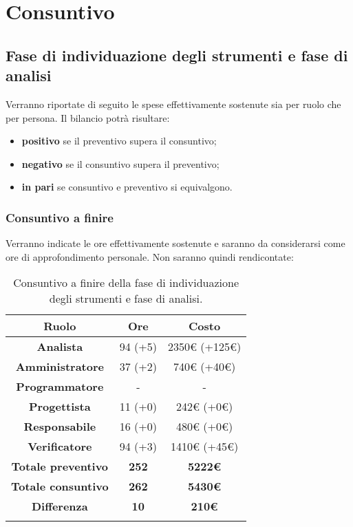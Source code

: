 \section{Consuntivo}

\subsection{Fase di individuazione degli strumenti e fase di analisi}
Verranno riportate di seguito le spese effettivamente sostenute sia per ruolo che per persona. Il bilancio potrà risultare:
\begin{itemize}
	\item \textbf{positivo} se il preventivo supera il consuntivo;
	\item \textbf{negativo} se il consuntivo supera il preventivo;
	\item \textbf{in pari} se consuntivo e preventivo si equivalgono.
\end{itemize}

\subsubsection{Consuntivo a finire}
Verranno indicate le ore effettivamente sostenute e saranno da considerarsi come ore di approfondimento personale. Non saranno quindi rendicontate:

\begin{center}
	\begin{longtable}{| c | c | c |}
		\hline
		\rowcolor[HTML]{F9CB9C} 
		\textbf{Ruolo} & \textbf{Ore} & \textbf{Costo}  \\ \hline
		\textbf{Analista} & 94 (+5) & 2350€ (+125€)  \\ \hline
		\textbf{Amministratore} & 37 (+2) & 740€ (+40€)  \\ \hline
		\textbf{Programmatore} & - & -  \\ \hline
		\textbf{Progettista}  & 11 (+0) & 242€ (+0€)  \\ \hline
		 \textbf{Responsabile}  & 16 (+0) & 480€ (+0€)  \\ \hline
		   \textbf{Verificatore} & 94 (+3) & 1410€ (+45€)  \\ \hline
		     \textbf{Totale preventivo}  & \textbf{252} &  \textbf{5222€} \\ \hline
		     \textbf{Totale consuntivo}  & \textbf{262} &  \textbf{5430€} \\ \hline
		\rowcolor[HTML]{F9CB9C}
		\textbf{Differenza} & \textbf{10}  &  \textbf{210€} \\ \hline
		\caption{Consuntivo a finire della fase di individuazione degli strumenti e fase di analisi.}
		\label{fig: Consuntivo a finire della fase di individuazione degli strumenti e fase di analisi.}
	\end{longtable}
\end{center}

